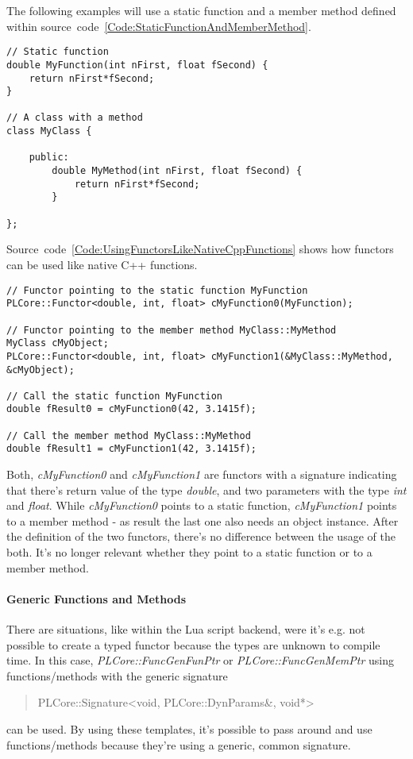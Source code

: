 The following examples will use a static function and a member method defined within source~code~\ref{Code:StaticFunctionAndMemberMethod}.
\begin{lstlisting}[float=htb,label=Code:StaticFunctionAndMemberMethod,caption={Static function and member method}]
// Static function
double MyFunction(int nFirst, float fSecond) {
	return nFirst*fSecond;
}

// A class with a method
class MyClass {

	public:
		double MyMethod(int nFirst, float fSecond) {
			return nFirst*fSecond;
		}

};
\end{lstlisting}
Source~code~\ref{Code:UsingFunctorsLikeNativeCppFunctions} shows how functors can be used like native C++ functions.
\begin{lstlisting}[float=htb,label=Code:UsingFunctorsLikeNativeCppFunctions,caption={Using functors like native C++ functions}]
// Functor pointing to the static function MyFunction
PLCore::Functor<double, int, float> cMyFunction0(MyFunction);

// Functor pointing to the member method MyClass::MyMethod
MyClass cMyObject;
PLCore::Functor<double, int, float> cMyFunction1(&MyClass::MyMethod, &cMyObject);

// Call the static function MyFunction
double fResult0 = cMyFunction0(42, 3.1415f);

// Call the member method MyClass::MyMethod
double fResult1 = cMyFunction1(42, 3.1415f);
\end{lstlisting}
Both, \emph{cMyFunction0} and \emph{cMyFunction1} are functors with a signature indicating that there's return value of the type \emph{double}, and two parameters with the type \emph{int} and \emph{float}. While \emph{cMyFunction0} points to a static function, \emph{cMyFunction1} points to a member method - as result the last one also needs an object instance. After the definition of the two functors, there's no difference between the usage of the both. It's no longer relevant whether they point to a static function or to a member method.


\paragraph{Generic Functions and Methods}
There are situations, like within the Lua script backend, were it's e.g. not possible to create a typed functor because the types are unknown to compile time. In this case, \emph{PLCore::FuncGenFunPtr} or \emph{PLCore::FuncGenMemPtr} using functions/methods with the generic signature \begin{quote}PLCore::Signature<void, PLCore::DynParams\&, void*>\end{quote} can be used. By using these templates, it's possible to pass around and use functions/methods because they're using a generic, common signature.

